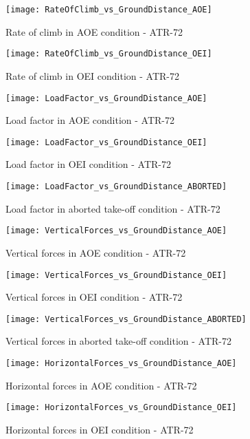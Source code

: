 %
\begin{figure}[!t]
\centering
\texttt{[image: RateOfClimb\_vs\_GroundDistance\_AOE]}
\caption{Rate of climb in AOE condition - ATR-72}
\end{figure}
%
\begin{figure}[!b]
\centering
\texttt{[image: RateOfClimb\_vs\_GroundDistance\_OEI]}
\caption{Rate of climb in OEI condition - ATR-72}
\end{figure}
%
\clearpage
%
\begin{figure}[H]
\centering
\texttt{[image: LoadFactor\_vs\_GroundDistance\_AOE]}
\caption{Load factor in AOE condition - ATR-72}
\end{figure}
%
\begin{figure}[H]
\centering
\texttt{[image: LoadFactor\_vs\_GroundDistance\_OEI]}
\caption{Load factor in OEI condition - ATR-72}
\end{figure}
%
\begin{figure}[H]
\centering
\texttt{[image: LoadFactor\_vs\_GroundDistance\_ABORTED]}
\caption{Load factor in aborted take-off condition - ATR-72}
\end{figure}
%
\begin{figure}[H]
\centering
\texttt{[image: VerticalForces\_vs\_GroundDistance\_AOE]}
\caption{Vertical forces in AOE condition - ATR-72}
\end{figure}
%
\begin{figure}[H]
\centering
\texttt{[image: VerticalForces\_vs\_GroundDistance\_OEI]}
\caption{Vertical forces in OEI condition - ATR-72}
\end{figure}
%
\begin{figure}[H]
\centering
\texttt{[image: VerticalForces\_vs\_GroundDistance\_ABORTED]}
\caption{Vertical forces in aborted take-off condition - ATR-72}
\end{figure}
%
\begin{figure}[H]
\centering
\texttt{[image: HorizontalForces\_vs\_GroundDistance\_AOE]}
\caption{Horizontal forces in AOE condition - ATR-72}
\end{figure}
%
\begin{figure}[H]
\centering
\texttt{[image: HorizontalForces\_vs\_GroundDistance\_OEI]}
\caption{Horizontal forces in OEI condition - ATR-72}
\end{figure}
